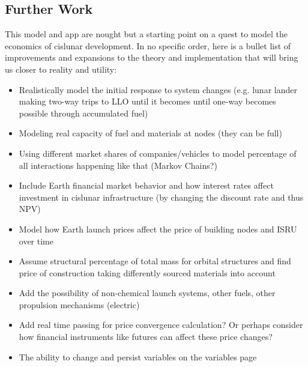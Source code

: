 \documentclass{article}
\begin{document}
\subsection{Further Work}
This model and app are nought but a starting point on a quest to model the economics of cislunar development. In no specific order, here is a bullet list of improvements and expansions to the theory and implementation that will bring us closer to reality and utility:
\begin{itemize}
    \item Realistically model the initial response to system changes (e.g. lunar lander making two-way trips to LLO until it becomes until one-way becomes possible through accumulated fuel)
    \item Modeling real capacity of fuel and materials at nodes (they can be full)
    \item Using different market shares of companies/vehicles to model percentage of all interactions happening like that (Markov Chains?)
    \item Include Earth financial market behavior and how interest rates affect investment in cislunar infrastructure (by changing the discount rate and thus NPV)
    \item Model how Earth launch prices affect the price of building nodes and ISRU over time
    \item Assume structural percentage of total mass for orbital structures and find price of construction taking differently sourced materials into account
    \item Add the possibility of non-chemical launch systems, other fuels, other propulsion mechanisms (electric)
    \item Add real time passing for price convergence calculation? Or perhaps consider how financial instruments like futures can affect these price changes?
    \item The ability to change and persist variables on the variables page
\end{itemize}
\end{document}
